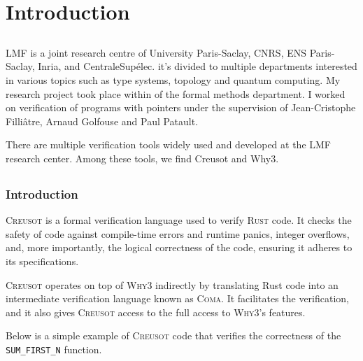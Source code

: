 \documentclass[11pt,a4paper]{report}
\begin{document}
\renewcommand\bibname{References} 



\tableofcontents

\newpage
{} 

\chapter{Introduction}

\section{}
LMF is a joint research centre of University Paris-Saclay, CNRS, ENS Paris-Saclay, Inria, and CentraleSupélec. it's divided to multiple departments interested in various topics such as type systems, topology and quantum computing. My research project took place within  of the formal methods department. I worked on verification of programs with pointers under the supervision of Jean-Cristophe Filliâtre, Arnaud Golfouse and Paul Patault.

There are multiple verification tools widely used and developed at the LMF research center. Among these tools, we find Creusot and Why3.

\section{}
\subsection{Introduction}
\textsc{Creusot} is a formal verification language used to verify \textsc{Rust} code. It checks the safety of code against compile-time errors and runtime panics, integer overflows, and, more importantly, the logical correctness of the code, ensuring it adheres to its specifications.

\textsc{Creusot} operates on top of \textsc{Why3} indirectly by translating Rust code into an intermediate verification language known as \textsc{Coma}. It facilitates the verification, and it also gives \textsc{Creusot} access to the full access to \textsc{Why3}'s features.

Below is a simple example of \textsc{Creusot} code that verifies the correctness of the \texttt{SUM\_FIRST\_N} function.
\end{document}
